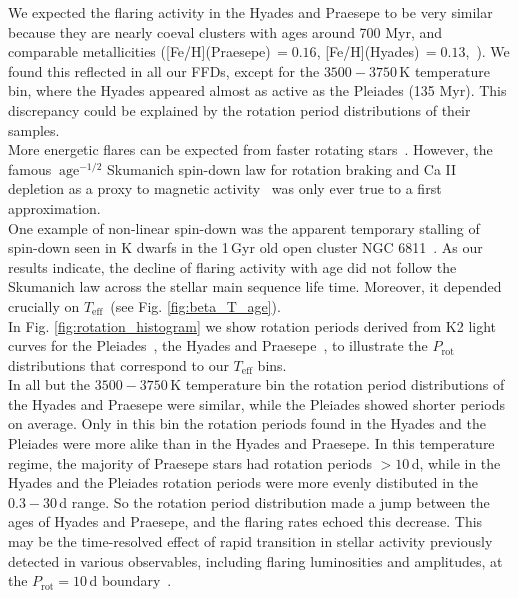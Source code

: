 \documentclass{aa}
\begin{document}
We expected the flaring activity in the Hyades and Praesepe to be very similar because they are nearly coeval clusters with ages around 700 Myr, and comparable metallicities ([Fe/H](Praesepe)\,$=0.16$, [Fe/H](Hyades)\,$=0.13$,~\citealt{netopil_metallicities_2016}). We found this reflected in all our FFDs, except for the $3500-3750$\,K temperature bin, where the Hyades appeared almost as active as the Pleiades (135 Myr). This discrepancy could be explained by the rotation period distributions of their samples. 
\\
More energetic flares can be expected from faster rotating stars~\citep{candelaresi_superflare_2014, doorsselaere_stellar_2017, yang_flaring_2017}. However, the famous $~\mathrm{age}^{-1/2}$ Skumanich spin-down law for rotation braking and Ca II depletion as a proxy to magnetic activity~\citep{skumanich1972} was only ever true to a first approximation.
\\
One example of non-linear spin-down was the apparent temporary stalling of spin-down seen in K dwarfs in the 1\,Gyr old open cluster NGC 6811~\citep{curtis2019}. As our results indicate, the decline of flaring activity with age did not follow the Skumanich law across the stellar main sequence life time. Moreover, it depended crucially on $T_\mathrm{eff}$~(see Fig. \ref{fig:beta_T_age}). 
\\
In Fig. \ref{fig:rotation_histogram} we show rotation periods derived from K2 light curves for the Pleiades~\citep{rebull_pleiadesrot_2016}, the Hyades and Praesepe~\citep{douglas2019}, to illustrate the $P_\mathrm{rot}$ distributions that correspond to our $T_\mathrm{eff}$ bins.
\\
In all but the $3500-3750$\,K temperature bin the rotation period distributions of the Hyades and Praesepe were similar, while the Pleiades showed shorter periods on average. Only in this bin the rotation periods found in the Hyades and the Pleiades were more alike than in the Hyades and Praesepe. In this temperature regime, the majority of Praesepe stars had rotation periods $>10$\,d, while in the Hyades and the Pleiades rotation periods were more evenly distibuted in the $0.3-30$\,d range. So the rotation period distribution made a jump between the ages of Hyades and Praesepe, and the flaring rates echoed this decrease. This may be the time-resolved effect of rapid transition in stellar activity previously detected in various observables, including flaring luminosities and amplitudes, at the $P_\mathrm{rot}=10$\,d boundary~\citep{stelzer2016, lu2019}.
\end{document}
